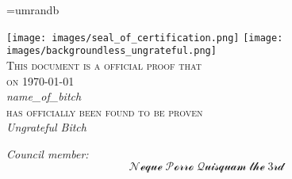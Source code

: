 \documentclass[landscape,a4paper,12pt]{article}
\def\bitchname{{name\_of\_bitch}} %
\def\dateofcert{\today} %
\def\nameofcouncilmember{{Neque\;Porro\;Quisquam\;the\;3rd}}
\begin{document}
\pagecolor{yellow!10}
\centering
\begin{minipage}{1.0\textwidth}
\font\border=umrandb
\generalframe
{\border {}} %
{\border {}} %
{\border {}} %
{\border {}} %
{\border {}} %
{\border {}} %
{\border {}} %
{\border {}} %
{\centering
  \texttt{[image: images/seal\_of\_certification.png]}
  \texttt{[image: images/backgroundless\_ungrateful.png]}\\[0.5cm]
  \textsc{\Large This document is a official proof that}\\[0.5cm]
  \textsc{\Large on} {\Large {\dateofcert}}\\[1cm]
  
  {\huge \itshape \bitchname}\\[1cm]
  
  \textsc{\Large has officially been found to be proven}\\[1cm]
  
  {\LARGE \itshape Ungrateful Bitch}\\[1cm]
  
  \begin{minipage}{0.5\textwidth}
    \large
      \emph{Council member:}
      \LARGE{$$\mathcal{\nameofcouncilmember}$$}
      \vspace*{1cm}
  \end{minipage}
}
\end{minipage}
\end{document}
